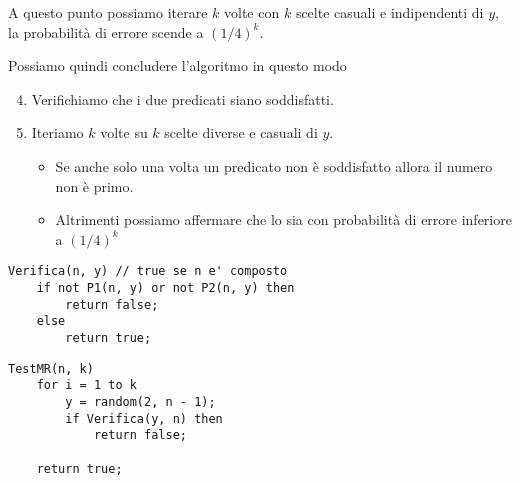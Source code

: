 A questo punto possiamo iterare $k$ volte con $k$ scelte casuali e indipendenti di $y$, la probabilit\`a di errore scende
a $(1/4)^k$.

Possiamo quindi concludere l'algoritmo in questo modo
\begin{enumerate}
	\setcounter{enumi}{3}
	\item Verifichiamo che i due predicati siano soddisfatti.
	\item Iteriamo $k$ volte su $k$ scelte diverse e casuali di $y$.
	      \begin{itemize}
		      \item Se anche solo una volta un predicato non \`e soddisfatto allora il numero non \`e primo.
		      \item Altrimenti possiamo affermare che lo sia con probabilit\`a di errore inferiore a $(1/4)^k$
	      \end{itemize}
\end{enumerate}

\begin{lstlisting}[style=pseudo-style]
Verifica(n, y) // true se n e' composto
	if not P1(n, y) or not P2(n, y) then
		return false;
	else
		return true;
\end{lstlisting}

\begin{lstlisting}[style=pseudo-style]
TestMR(n, k)
	for i = 1 to k
		y = random(2, n - 1);
		if Verifica(y, n) then 
			return false;

	return true;
\end{lstlisting}

